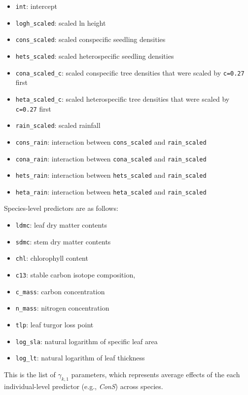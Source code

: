 \documentclass[
  11pt,
  letterpaper,
  DIV=11,
  numbers=noendperiod]{scrartcl}
\providecommand{\tightlist}{%
  \setlength{\itemsep}{0pt}\setlength{\parskip}{0pt}}\usepackage{longtable,booktabs,array}
\begin{document}
\begin{itemize}
\tightlist
\item
  \texttt{int}: intercept
\item
  \texttt{logh\_scaled}: scaled ln height
\item
  \texttt{cons\_scaled}: scaled conspecific seedling densities
\item
  \texttt{hets\_scaled}: scaled heterospecific seedling densities
\item
  \texttt{cona\_scaled\_c}: scaled conspecific tree densities that were
  scaled by \texttt{c=0.27} first
\item
  \texttt{heta\_scaled\_c}: scaled heterospecific tree densities that
  were scaled by \texttt{c=0.27} first
\item
  \texttt{rain\_scaled}: scaled rainfall
\item
  \texttt{cons\_rain}: interaction between \texttt{cons\_scaled} and
  \texttt{rain\_scaled}
\item
  \texttt{cona\_rain}: interaction between \texttt{cona\_scaled} and
  \texttt{rain\_scaled}
\item
  \texttt{hets\_rain}: interaction between \texttt{hets\_scaled} and
  \texttt{rain\_scaled}
\item
  \texttt{heta\_rain}: interaction between \texttt{heta\_scaled} and
  \texttt{rain\_scaled}
\end{itemize}

Species-level predictors are as follows:

\begin{itemize}
\tightlist
\item
  \texttt{ldmc}: leaf dry matter contents
\item
  \texttt{sdmc}: stem dry matter contents
\item
  \texttt{chl}: chlorophyll content
\item
  \texttt{c13}: stable carbon isotope composition,
\item
  \texttt{c\_mass}: carbon concentration
\item
  \texttt{n\_mass}: nitrogen concentration
\item
  \texttt{tlp}: leaf turgor loss point
\item
  \texttt{log\_sla}: natural logarithm of specific leaf area
\item
  \texttt{log\_lt}: natural logarithm of leaf thickness
\end{itemize}

This is the list of \(\gamma_{k,1}\) parameters, which represents
average effects of the each individual-level predictor (e.g.,
\emph{ConS}) across species.
\end{document}
